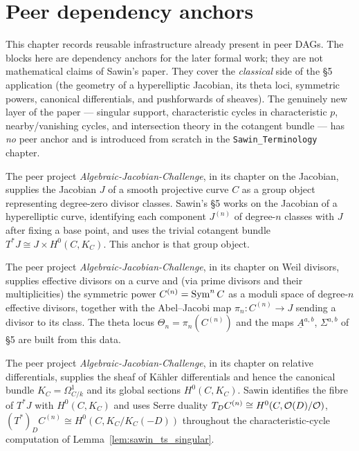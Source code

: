 \section{Peer dependency anchors}

This chapter records reusable infrastructure already present in peer DAGs.  The
blocks here are dependency anchors for the later formal work; they are not
mathematical claims of Sawin's paper.  They cover the \emph{classical} side of
the §5 application (the geometry of a hyperelliptic Jacobian, its theta loci,
symmetric powers, canonical differentials, and pushforwards of sheaves).  The
genuinely new layer of the paper --- singular support, characteristic cycles in
characteristic $p$, nearby/vanishing cycles, and intersection theory in the
cotangent bundle --- has \emph{no} peer anchor and is introduced from scratch in
the \texttt{Sawin\_Terminology} chapter.

\begin{definition}
  \label{def:peer_jacobian}
  The peer project \emph{Algebraic-Jacobian-Challenge}, in its chapter on the
  Jacobian, supplies the Jacobian $J$ of a smooth projective curve $C$ as a
  group object representing degree-zero divisor classes.  Sawin's §5 works on
  the Jacobian of a hyperelliptic curve, identifying each component $J^{(n)}$ of
  degree-$n$ classes with $J$ after fixing a base point, and uses the trivial
  cotangent bundle $T^*J \cong J \times H^0(C,K_C)$.  This anchor is that group
  object.
\end{definition}

\begin{definition}
  \label{def:peer_weil_divisor}
  The peer project \emph{Algebraic-Jacobian-Challenge}, in its chapter on Weil
  divisors, supplies effective divisors on a curve and (via prime divisors and
  their multiplicities) the symmetric power $C^{(n)} = \operatorname{Sym}^n C$ as a moduli
  space of degree-$n$ effective divisors, together with the Abel--Jacobi map
  $\pi_n : C^{(n)} \to J$ sending a divisor to its class.  The theta locus
  $\Theta_n = \pi_n(C^{(n)})$ and the maps $\underline A^{a,b}$, $\Sigma^{a,b}$
  of §5 are built from this data.
\end{definition}

\begin{definition}
  \label{def:peer_canonical_differentials}
  The peer project \emph{Algebraic-Jacobian-Challenge}, in its chapter on
  relative differentials, supplies the sheaf of Kähler differentials and hence
  the canonical bundle $K_C = \Omega^1_{C/k}$ and its global sections
  $H^0(C,K_C)$.  Sawin identifies the fibre of $T^*J$ with $H^0(C,K_C)$ and uses
  Serre duality $T_{D}C^{(n)} \cong H^0(C,\mathcal{O}(D)/\mathcal{O})$,
  $(T^*)_{D}C^{(n)} \cong H^0(C, K_C/K_C(-D))$ throughout the
  characteristic-cycle computation of Lemma~\ref{lem:sawin_ts_singular}.
\end{definition}

